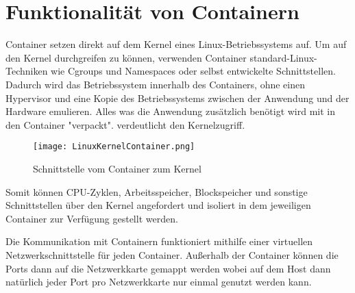 \section{Funktionalität von Containern}
\label{sec:Funktionalität von Container}

Container setzen direkt auf dem Kernel eines Linux-Betriebssystems auf. Um auf den Kernel durchgreifen zu können, verwenden Container standard-Linux-Techniken wie Cgroups und Namespaces oder selbst entwickelte Schnittstellen. Dadurch wird das Betriebssystem innerhalb des Containers, ohne einen Hypervisor und eine Kopie des Betriebssystems zwischen der Anwendung und der Hardware emulieren. Alles was die Anwendung zusätzlich benötigt wird mit in den Container "verpackt".\cite{10228802020150501}  verdeutlicht den Kernelzugriff.

\begin{figure}[H]
	\begin{center}
		\texttt{[image: LinuxKernelContainer.png]}
	\end{center}
	\caption[Schnittstelle vom Container zum Kernel]{Schnittstelle vom Container zum Kernel \footnotemark}
	\label{fig:linuxkernelcontainer}
\end{figure}
Somit können CPU-Zyklen, Arbeitsspeicher, Blockspeicher und sonstige Schnittstellen über den Kernel angefordert und isoliert in dem jeweiligen Container zur Verfügung gestellt werden.\cite{12059254020170101}

Die Kommunikation mit Containern funktioniert mithilfe einer virtuellen Netzwerkschnittstelle für jeden Container. Außerhalb der Container können die Ports dann auf die Netzwerkkarte gemappt werden wobei auf dem Host dann natürlich jeder Port pro Netzwerkkarte nur einmal genutzt werden kann.\cite{10228802020150501}

